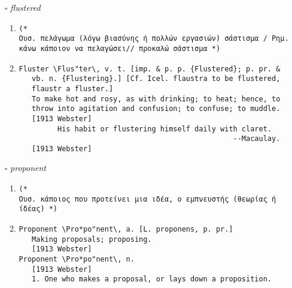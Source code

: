\documentclass{article}
\begin{document}
\begin{itemize}
\begin{enumerate}
\item{
\begin{lstlisting}
Froward \Fro"ward\, a. [Fro + -ward. See {Fro}, and cf.
   {Fromward}.]
   Not willing to yield or compIy with what is required or is
   reasonable; perverse; disobedient; peevish; as, a froward
   child.
   [1913 Webster]
         A froward man soweth strife.             --Prov. xvi.
                                                  28.
   [1913 Webster]
         A froward retention of custom is as turbulent a thing
         as innovation.                           --Bacon.
   Syn: Untoward; wayward; unyielding; ungovernable: refractory;
        obstinate; petulant; cross; peevish. See {Perverse}. --
        {Fro"ward*ly}, adv. -- {Fro"ward*ness}, n.
        [1913 Webster]
\end{lstlisting}}
\end{enumerate}
\item[$\square$] \emph{ flustered }
\begin{enumerate}
\item{
\begin{lstlisting}
(* 
Ουσ. πελάγωμα (λόγω βιασύνης ή πολλών εργασιών) σάστισμα / Ρημ. κάνω κάποιον να πελαγώσει// προκαλώ σάστισμα *)
\end{lstlisting}}
\item{
\begin{lstlisting}
Fluster \Flus"ter\, v. t. [imp. & p. p. {Flustered}; p. pr. &
   vb. n. {Flustering}.] [Cf. Icel. flaustra to be flustered,
   flaustr a fluster.]
   To make hot and rosy, as with drinking; to heat; hence, to
   throw into agitation and confusion; to confuse; to muddle.
   [1913 Webster]
         His habit or flustering himself daily with claret.
                                                  --Macaulay.
   [1913 Webster]
\end{lstlisting}}
\end{enumerate}
\item[$\square$] \emph{ proponent }
\begin{enumerate}
\item{
\begin{lstlisting}
(* 
Ουσ. κάποιος που προτείνει μια ιδέα, ο εμπνευστής (θεωρίας ή ίδέας) *)
\end{lstlisting}}
\item{
\begin{lstlisting}
Proponent \Pro*po"nent\, a. [L. proponens, p. pr.]
   Making proposals; proposing.
   [1913 Webster]
Proponent \Pro*po"nent\, n.
   [1913 Webster]
   1. One who makes a proposal, or lays down a proposition.

\end{lstlisting}}
\end{enumerate}
\end{itemize}
\end{document}
